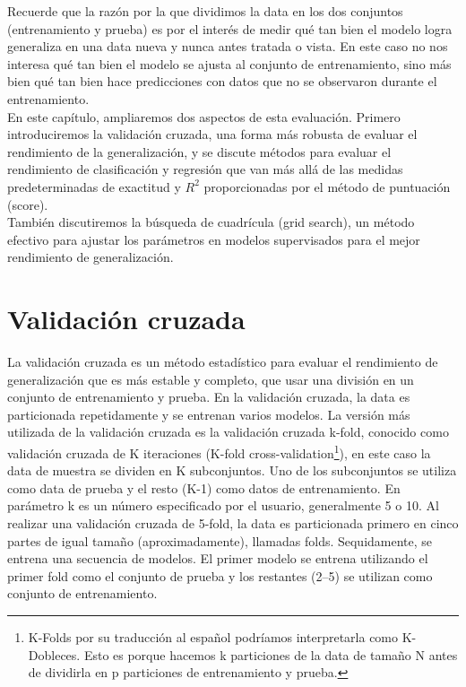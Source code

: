 Recuerde que la razón por la que dividimos la data  en los dos conjuntos (entrenamiento y prueba) es por el interés de medir qué tan bien el modelo logra generaliza en una data nueva y nunca antes tratada o vista.  En este caso no nos interesa qué tan bien el modelo se ajusta al conjunto de entrenamiento, sino más bien 
qué tan bien  hace predicciones con datos que no se observaron durante el entrenamiento.\\

En este capítulo, ampliaremos dos aspectos de esta evaluación.  Primero introduciremos la validación cruzada, una forma más robusta de evaluar el rendimiento de la generalización, y se discute métodos para evaluar el rendimiento de clasificación y regresión que van  más allá de las medidas predeterminadas de  exactitud  y $ R^{2} $  proporcionadas por el método de puntuación ({\ttfamily score}).\\

También discutiremos la búsqueda de cuadrícula (grid search), un método efectivo para ajustar los 
parámetros en modelos supervisados para el mejor rendimiento de generalización.




\section{Validación cruzada}




La validación cruzada es un método estadístico para evaluar el rendimiento de generalización que
es más estable y completo,  que usar una división en un conjunto de entrenamiento y prueba.  En la validación cruzada, la data es particionada repetidamente y se entrenan varios modelos.   La versión más utilizada de la validación cruzada es la validación cruzada k-fold, conocido como validación cruzada de K iteraciones (K-fold cross-validation\footnote{K-Folds por su traducción al español podríamos interpretarla como K-Dobleces. Esto es porque hacemos k particiones de la data de tamaño N antes de dividirla en p particiones de entrenamiento y prueba.}), en este caso la data de muestra se dividen en K subconjuntos. Uno de los subconjuntos se utiliza como data de prueba y el resto (K-1) como datos de entrenamiento. En parámetro  k es un número especificado por el usuario, generalmente 5 o 10.  Al realizar una validación cruzada de 5-fold, la data es particionada  primero en cinco partes de  igual tamaño (aproximadamente), llamadas folds.
Sequidamente, se entrena una secuencia de modelos. El primer modelo se entrena  utilizando el primer fold  como el conjunto de prueba y los  restantes (2–5) se utilizan como conjunto de entrenamiento. 

